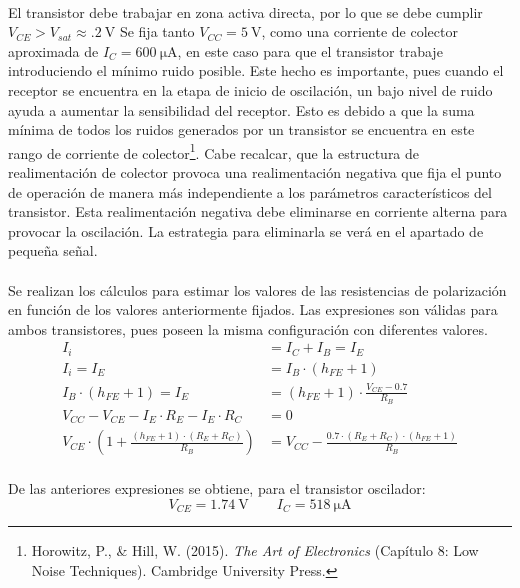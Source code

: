 \paragraph{}
El transistor debe trabajar en zona activa directa, por lo que se debe cumplir $V_{CE} > V_{sat} \approx \SI{.2}{\volt}$ %
Se fija tanto $V_{CC} = \SI{5}{\volt}$, como una corriente de colector aproximada de $I_C = \SI{600}{\micro\ampere}$, en este caso para que el transistor trabaje introduciendo el mínimo ruido posible.
Este hecho es importante, pues cuando el receptor se encuentra en la etapa de inicio de oscilación, un bajo nivel de ruido ayuda a aumentar la sensibilidad del receptor. Esto es debido a que la suma mínima de todos los ruidos generados por un transistor se encuentra en este rango de corriente de colector\footnote{Horowitz, P., \& Hill, W. (2015). \textit{The Art of Electronics} (Capítulo 8: Low Noise Techniques). Cambridge University Press.}.
Cabe recalcar, que la estructura de realimentación de colector provoca una realimentación negativa que fija el punto de operación de manera más independiente a los parámetros característicos del transistor. Esta realimentación negativa debe eliminarse en corriente alterna para provocar la oscilación. La estrategia para eliminarla se verá en el apartado de pequeña señal.
\paragraph{}
Se realizan los cálculos para estimar los valores de las resistencias de polarización en función de los valores anteriormente fijados. Las expresiones son v\'alidas para ambos transistores, pues poseen la misma configuraci\'on con diferentes valores.
\begin{align*} 
   I_i &= I_C + I_B = I_E \\
   I_i = I_E &= I_B \cdot (h_{FE} + 1) \\
   I_B \cdot (h_{FE} + 1) = I_E &= (h_{FE} + 1) \cdot \frac{V_{CE} - 0.7}{R_B} \\
   V_{CC} - V_{CE} - I_E \cdot R_E - I_E \cdot R_C &= 0 \\
   V_{CE} \cdot \left( 1 + \frac{(h_{FE} + 1) \cdot (R_E+R_C)}{R_B} \right) &= V_{CC} - \frac{0.7 \cdot (R_E+R_C) \cdot (h_{FE} + 1)}{R_B}
\end{align*}
\paragraph{}
De las anteriores expresiones se obtiene, para el transistor oscilador:
\begin{equation}
   V_{CE} = \SI{1.74}{\volt} \quad \quad I_C = \SI{518}{\micro\ampere}
\end{equation}
